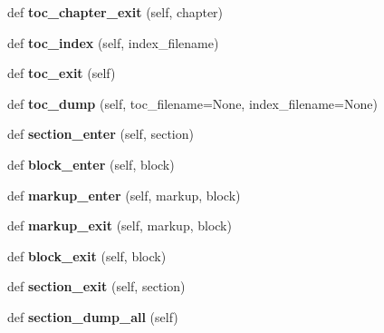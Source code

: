 \begin{DoxyCompactItemize}
\mbox{\label{classtohtml_1_1_html_formatter_ae63863f8155b42c950420b48510a13b8}} 
def {\bfseries toc\+\_\+chapter\+\_\+exit} (self, chapter)
\item 
\mbox{\label{classtohtml_1_1_html_formatter_aec4834ede6ca4be8c6ac91fe94becaf7}} 
def {\bfseries toc\+\_\+index} (self, index\+\_\+filename)
\item 
\mbox{\label{classtohtml_1_1_html_formatter_a8d73753877a0eae8328e4e290de06eff}} 
def {\bfseries toc\+\_\+exit} (self)
\item 
\mbox{\label{classtohtml_1_1_html_formatter_a25840a4b96474135c542c485467dcccc}} 
def {\bfseries toc\+\_\+dump} (self, toc\+\_\+filename=None, index\+\_\+filename=None)
\item 
\mbox{\label{classtohtml_1_1_html_formatter_a5fcc3c66933136861eb36d0ab8bc045e}} 
def {\bfseries section\+\_\+enter} (self, section)
\item 
\mbox{\label{classtohtml_1_1_html_formatter_a668a68920a4987877454fa8fe2d10fa1}} 
def {\bfseries block\+\_\+enter} (self, block)
\item 
\mbox{\label{classtohtml_1_1_html_formatter_a0e18cfa08add6256ff48f0e85566a4af}} 
def {\bfseries markup\+\_\+enter} (self, markup, block)
\item 
\mbox{\label{classtohtml_1_1_html_formatter_a28ff6f4bbd9113ff2a69876046b3200c}} 
def {\bfseries markup\+\_\+exit} (self, markup, block)
\item 
\mbox{\label{classtohtml_1_1_html_formatter_a4888bc91c0bf4d6bf57f9b13e108189b}} 
def {\bfseries block\+\_\+exit} (self, block)
\item 
\mbox{\label{classtohtml_1_1_html_formatter_a54d95a98c85c5187532b9f9a99b8c435}} 
def {\bfseries section\+\_\+exit} (self, section)
\item 
\mbox{\label{classtohtml_1_1_html_formatter_abf08a1aed2dce168137b82161d93bc8f}} 
def {\bfseries section\+\_\+dump\+\_\+all} (self)
\end{DoxyCompactItemize}
